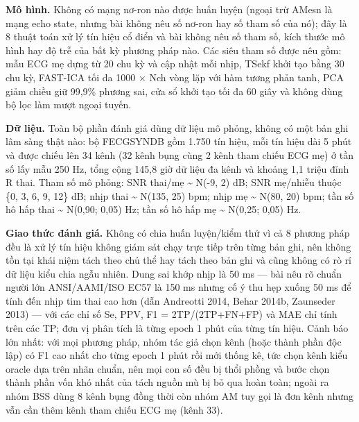 \documentclass[12pt,a4paper]{article}
\begin{document}
\noindent \textbf{Mô hình.} Không có mạng nơ-ron nào được huấn luyện (ngoại trừ AMesn là mạng echo state, nhưng bài không nêu số nơ-ron hay số tham số của nó); đây là 8 thuật toán xử lý tín hiệu cổ điển và bài không nêu số tham số, kích thước mô hình hay độ trễ của bất kỳ phương pháp nào. Các siêu tham số được nêu gồm: mẫu ECG mẹ dựng từ 20 chu kỳ và cập nhật mỗi nhịp, TSekf khởi tạo bằng 30 chu kỳ, FAST-ICA tối đa 1000 × Nch vòng lặp với hàm tương phản tanh, PCA giảm chiều giữ 99,9\% phương sai, cửa sổ khởi tạo tối đa 60 giây và không dùng bộ lọc làm mượt ngoại tuyến.\par\vspace{3pt}
\noindent \textbf{Dữ liệu.} Toàn bộ phần đánh giá dùng dữ liệu mô phỏng, không có một bản ghi lâm sàng thật nào: bộ FECGSYNDB gồm 1.750 tín hiệu, mỗi tín hiệu dài 5 phút và được chiếu lên 34 kênh (32 kênh bụng cùng 2 kênh tham chiếu ECG mẹ) ở tần số lấy mẫu 250 Hz, tổng cộng 145,8 giờ dữ liệu đa kênh và khoảng 1,1 triệu đỉnh R thai. Tham số mô phỏng: SNR thai/mẹ \textasciitilde{} N(-9, 2) dB; SNR mẹ/nhiễu thuộc \{0, 3, 6, 9, 12\} dB; nhịp thai \textasciitilde{} N(135, 25) bpm; nhịp mẹ \textasciitilde{} N(80, 20) bpm; tần số hô hấp thai \textasciitilde{} N(0,90; 0,05) Hz; tần số hô hấp mẹ \textasciitilde{} N(0,25; 0,05) Hz.\par\vspace{3pt}
\noindent \textbf{Giao thức đánh giá.} Không có chia huấn luyện/kiểm thử vì cả 8 phương pháp đều là xử lý tín hiệu không giám sát chạy trực tiếp trên từng bản ghi, nên không tồn tại khái niệm tách theo chủ thể hay tách theo bản ghi và cũng không có rò rỉ dữ liệu kiểu chia ngẫu nhiên. Dung sai khớp nhịp là 50 ms — bài nêu rõ chuẩn người lớn ANSI/AAMI/ISO EC57 là 150 ms nhưng cố ý thu hẹp xuống 50 ms để tính đến nhịp tim thai cao hơn (dẫn Andreotti 2014, Behar 2014b, Zaunseder 2013) — với các chỉ số Se, PPV, F1 = 2TP/(2TP+FN+FP) và MAE chỉ tính trên các TP; đơn vị phân tích là từng epoch 1 phút của từng tín hiệu. Cảnh báo lớn nhất: với mọi phương pháp, nhóm tác giả chọn kênh (hoặc thành phần độc lập) có F1 cao nhất cho từng epoch 1 phút rồi mới thống kê, tức chọn kênh kiểu oracle dựa trên nhãn chuẩn, nên mọi con số đều bị thổi phồng và bước chọn thành phần vốn khó nhất của tách nguồn mù bị bỏ qua hoàn toàn; ngoài ra nhóm BSS dùng 8 kênh bụng đồng thời còn nhóm AM tuy gọi là đơn kênh nhưng vẫn cần thêm kênh tham chiếu ECG mẹ (kênh 33).\par\vspace{3pt}
\end{document}
